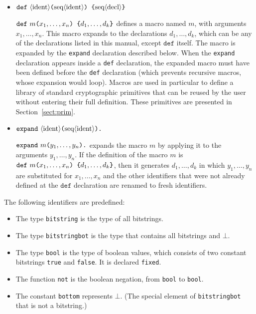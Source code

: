 \begin{itemize}
\item ${\tt def\ }\nonterm{ident}\texttt{(}\seq{ident}\texttt{) \{}
\seq{decl}\texttt{\}}$ 

${\tt def\ }m\texttt{(}x_1, \ldots, x_n\texttt{) \{}
d_1, \ldots, d_k\texttt{\}}$ defines a macro named $m$, with arguments
$x_1, \ldots, x_n$. This macro expands to the declarations
$d_1, \ldots, d_k$, which can be any of the declarations listed in
this manual, except $\texttt{def}$ itself.
The macro is expanded by the \texttt{expand} declaration described below.
When the \texttt{expand} declaration appears inside a \texttt{def}
declaration, the expanded macro must have been defined before the
\texttt{def} declaration (which prevents recursive macros, whose
expansion would loop).
Macros are used in particular to define a library of standard
cryptographic primitives that can be reused by the user without
entering their full definition. These primitives are presented
in Section~\ref{sect:prim}.

\item ${\tt expand\ }\nonterm{ident}\texttt{(}\seq{ident}\texttt{).}$

${\tt expand\ }m\texttt{(}y_1, \ldots, y_n\texttt{).}$ expands the macro
$m$ by applying it to the arguments $y_1, \ldots, y_n$. If the definition
of the macro $m$ is ${\tt def\ }m\texttt{(}x_1, \ldots, x_n\texttt{) \{}
d_1, \ldots, d_k\texttt{\}}$, then it generates $d_1, \ldots, d_k$ in which
$y_1, \ldots, y_n$ are substituted for $x_1, \ldots, x_n$ and the other
identifiers that were not already defined at the $\texttt{def}$ declaration
are renamed to fresh identifiers.

\end{itemize}

The following identifiers are predefined:
\begin{itemize}

\item The type {\tt bitstring} is the type of all bitstrings.

\item The type {\tt bitstringbot} is the type that contains
all bitstrings and $\bot$.

\item The type {\tt bool} is the type of boolean values, which consists
of two constant bitstrings {\tt true} and {\tt false}.
It is declared {\tt fixed}.

\item The function {\tt not} is the boolean negation, from
{\tt bool} to {\tt bool}.

\item The constant {\tt bottom} represents $\bot$. (The special
element of {\tt bitstringbot} that is not a bitstring.)

\end{itemize}

